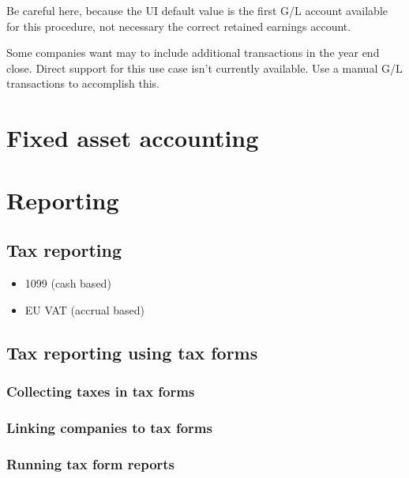 Be careful here, because the UI default value is the first G/L account available for this procedure, 
not necessary the correct retained earnings account.

Some companies want may to include additional transactions in the year end close.
Direct support for this use case isn't currently available.
Use a manual G/L transactions to accomplish this.


\section{Fixed asset accounting}
\label{sec-business-processes-accounting-fixed-asset-accounting}



\section{Reporting}
\label{sec-business-processes-accounting-reporting}

\subsection{Tax reporting}
\label{subsec-business-processes-accounting-reporting-tax}


\begin{itemize}
\item 1099 (cash based)
\item EU \gls{VAT} (accrual based)
\end{itemize}


\subsection{Tax reporting using tax forms}
\label{subsec-business-processes-accounting-reporting-tax-with-taxforms}

\subsubsection{Collecting taxes in tax forms}
\label{subsubsec-business-processes-accounting-reporting-tax-collecting-taxforms}

\subsubsection{Linking companies to tax forms}
\label{subsubsec-business-processes-accounting-reporting-tax-linking-taxforms}

\subsubsection{Running tax form reports}
\label{subsubsec-business-processes-accounting-reporting-tax-running-taxforms}


